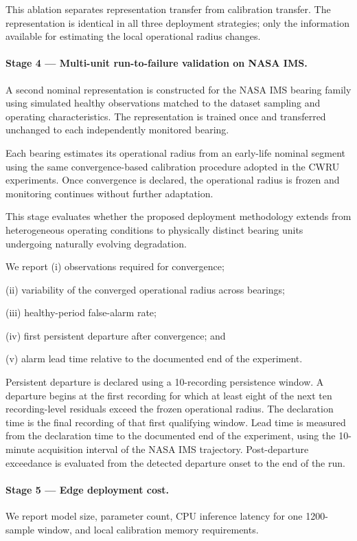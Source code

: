 \documentclass{trbunofficial}
\begin{document}
This ablation separates representation transfer from calibration transfer.
The representation is identical in all three deployment strategies; only the
information available for estimating the local operational radius changes.

\paragraph{Stage 4 --- Multi-unit run-to-failure validation on NASA IMS.}

A second nominal representation is constructed for the NASA IMS bearing
family using simulated healthy observations matched to the dataset sampling
and operating characteristics.
The representation is trained once and transferred unchanged to each
independently monitored bearing.

Each bearing estimates its operational radius from an early-life nominal
segment using the same convergence-based calibration procedure adopted in the
CWRU experiments.
Once convergence is declared, the operational radius is frozen and monitoring
continues without further adaptation.

This stage evaluates whether the proposed deployment methodology extends from
heterogeneous operating conditions to physically distinct bearing units
undergoing naturally evolving degradation.

We report
(i) observations required for convergence;

(ii) variability of the converged operational radius across bearings;

(iii) healthy-period false-alarm rate;

(iv) first persistent departure after convergence; and

(v) alarm lead time relative to the documented end of the experiment.

\vspace{0.1cm}
Persistent departure is declared using a 10-recording persistence window.
A departure begins at the first recording for which at least eight of the
next ten recording-level residuals exceed the frozen operational radius.
The declaration time is the final recording of that first qualifying
window. Lead time is measured from the declaration time to the documented
end of the experiment, using the 10-minute acquisition interval of the NASA
IMS trajectory. Post-departure exceedance is evaluated from the detected
departure onset to the end of the run.


\paragraph{Stage 5 --- Edge deployment cost.}
We report model size, parameter count, CPU inference latency for one 1200-sample window, 
and local calibration memory requirements.
\end{document}
